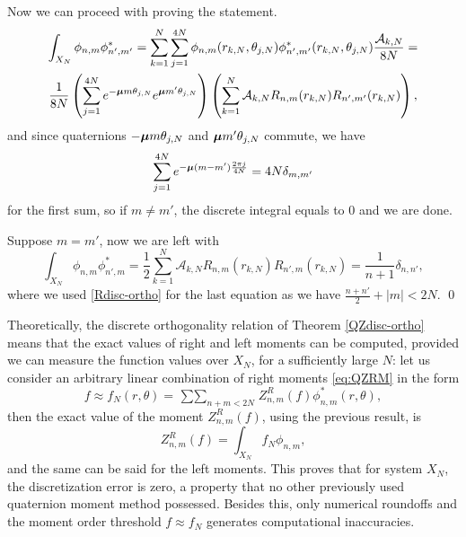 Now we can proceed with proving the statement. 
\[
\begin{gathered}
	\int_{X_N} \phi_{n,m} \phi^*_{n',m'} = \sum_{k=1}^{N} \sum_{j=1}^{4N} \phi_{n,m}(r_{k,N},\theta_{j,N}) \phi^*_{n',m'}(r_{k,N},					\theta_{j,N}) \frac{\mathcal{A}_{k,N}}{8N} = \\
	\frac{1}{8N} \left( \sum_{j=1}^{4N} e^{-\boldsymbol{\mu} m\theta_{j,N}}e^{\boldsymbol{\mu} m' \theta_{j,N}} \right) \left( \sum_{k=1}^N \mathcal{A}_{k,N} R_{n,m}(r_{k,N}) R_{n',m'}(r_{k,N}) \right),
\end{gathered}
\]
and since quaternions $-\boldsymbol{\mu} m\theta_{j,N}$ and $\boldsymbol{\mu} m' \theta_{j,N}$ commute, we have
\[
	\sum_{j=1}^{4N} e^{-\boldsymbol{\mu} (m-m')\frac{2\pi j}{4N}} = 4N\delta_{m,m'}
\]
for the first sum, so if $m\neq m'$, the discrete integral equals to $0$ and we are done.

Suppose $m=m'$, now we are left with
\[
	\int_{X_N} \phi_{n,m} \phi^*_{n',m} = \frac{1}{2} \sum_{k=1}^N \mathcal{A}_{k,N} R_{n,m}(r_{k,N}) R_{n',m}(r_{k,N}) = \frac{1}{n+1}\delta_{n,n'},
\]
where we used \eqref{Rdisc-ortho} for the last equation as we have $\frac{n+n'}{2}+|m| < 2N$.
\qed

Theoretically, the discrete orthogonality relation of Theorem \ref{QZdisc-ortho} means that the exact values of right and left moments can be computed, provided we can measure the function values over $X_N$, for a sufficiently large $N$: let us consider an arbitrary linear combination of right moments \eqref{eq:QZRM} in the form
\[
	f \approx f_N(r,\theta) = \mathop{\sum\sum}_{n+m<2N} Z^R_{n,m}(f) \phi^*_{n,m} (r,\theta),
\]
then the exact value of the moment $Z^R_{n,m}(f)$, using the previous result, is
\[
	Z^R_{n,m}(f) = \int_{X_N} f_N\phi_{n,m},
\]
and the same can be said for the left moments. This proves that for system $X_N$, the discretization error is zero, a property that no other previously used quaternion moment method possessed. Besides this, only numerical roundoffs and the moment order threshold $f \approx f_N$ generates computational inaccuracies.